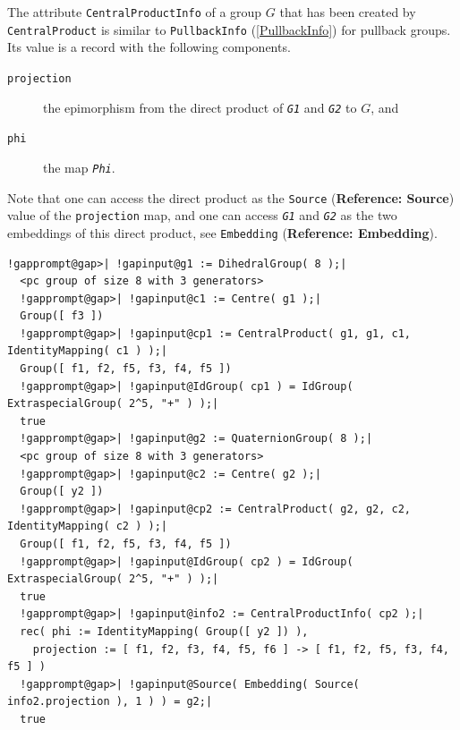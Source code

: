 \documentclass[a4paper,11pt]{report}
\begin{document}
{{{ The attribute \texttt{CentralProductInfo} of a group $G$ that has been created by \texttt{CentralProduct} is similar to \texttt{PullbackInfo} (\ref{PullbackInfo}) for pullback groups. Its value is a record with the following components. 

 
\begin{description}
\item[{\texttt{projection}}]  the epimorphism from the direct product of \mbox{\texttt{\mdseries\slshape G1}} and \mbox{\texttt{\mdseries\slshape G2}} to $G$, and 
\item[{\texttt{phi}}]  the map \mbox{\texttt{\mdseries\slshape Phi}}. 
\end{description}
 Note that one can access the direct product as the \texttt{Source} (\textbf{Reference: Source}) value of the \texttt{projection} map, and one can access \mbox{\texttt{\mdseries\slshape G1}} and \mbox{\texttt{\mdseries\slshape G2}} as the two embeddings of this direct product, see \texttt{Embedding} (\textbf{Reference: Embedding}). 
\begin{Verbatim}[commandchars=!@|,fontsize=\small,frame=single,label=Example]
  !gapprompt@gap>| !gapinput@g1 := DihedralGroup( 8 );|
  <pc group of size 8 with 3 generators>
  !gapprompt@gap>| !gapinput@c1 := Centre( g1 );|
  Group([ f3 ])
  !gapprompt@gap>| !gapinput@cp1 := CentralProduct( g1, g1, c1, IdentityMapping( c1 ) );|
  Group([ f1, f2, f5, f3, f4, f5 ])
  !gapprompt@gap>| !gapinput@IdGroup( cp1 ) = IdGroup( ExtraspecialGroup( 2^5, "+" ) );|
  true
  !gapprompt@gap>| !gapinput@g2 := QuaternionGroup( 8 );|
  <pc group of size 8 with 3 generators>
  !gapprompt@gap>| !gapinput@c2 := Centre( g2 );|
  Group([ y2 ])
  !gapprompt@gap>| !gapinput@cp2 := CentralProduct( g2, g2, c2, IdentityMapping( c2 ) );|
  Group([ f1, f2, f5, f3, f4, f5 ])
  !gapprompt@gap>| !gapinput@IdGroup( cp2 ) = IdGroup( ExtraspecialGroup( 2^5, "+" ) );|
  true
  !gapprompt@gap>| !gapinput@info2 := CentralProductInfo( cp2 );|
  rec( phi := IdentityMapping( Group([ y2 ]) ), 
    projection := [ f1, f2, f3, f4, f5, f6 ] -> [ f1, f2, f5, f3, f4, f5 ] )
  !gapprompt@gap>| !gapinput@Source( Embedding( Source( info2.projection ), 1 ) ) = g2;|
  true
\end{Verbatim}
 }

 

}}
\end{document}
